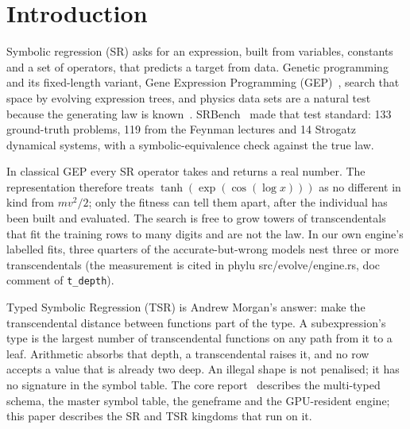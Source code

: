 \documentclass[sigconf,nonacm]{acmart}
\newcommand{\src}[1]{{\small\ttfamily #1}}
\begin{document}
\section{Introduction}
\label{sec:intro}

Symbolic regression (SR) asks for an expression, built from variables,
constants and a set of operators, that predicts a target from data. Genetic
programming~\cite{koza1992gp} and its fixed-length variant, Gene Expression
Programming (GEP)~\cite{ferreira2001gep}, search that space by evolving
expression trees, and physics data sets are a natural test because the
generating law is known~\cite{schmidt2009distilling,udrescu2020aifeynman}.
SRBench~\cite{lacava2021srbench} made that test standard: 133 ground-truth
problems, 119 from the Feynman lectures and 14 Strogatz dynamical systems, with
a symbolic-equivalence check against the true law.

In classical GEP every SR operator takes and returns a real number. The
representation therefore treats $\tanh(\exp(\cos(\log x)))$ as no different in
kind from $m v^2/2$; only the fitness can tell them apart, after the individual
has been built and evaluated. The search is free to grow towers of
transcendentals that fit the training rows to many digits and are not the law.
In our own engine's labelled fits, three quarters of the accurate-but-wrong
models nest three or more transcendentals (the measurement is cited in
\src{phylu src/\allowbreak{}evolve/\allowbreak{}engine.\allowbreak{}rs}, doc comment of \texttt{t\_depth}).

Typed Symbolic Regression (TSR) is Andrew Morgan's answer: make the
transcendental distance between functions part of the type. A subexpression's
type is the largest number of transcendental functions on any path from it to a
leaf. Arithmetic absorbs that depth, a transcendental raises it, and no row
accepts a value that is already two deep. An illegal shape is not penalised;
it has no signature in the symbol table. The core report~\cite{morgan_core}
describes the multi-typed schema, the master symbol table, the geneframe and
the GPU-resident engine; this paper describes the SR and TSR kingdoms that run
on it.
\end{document}
